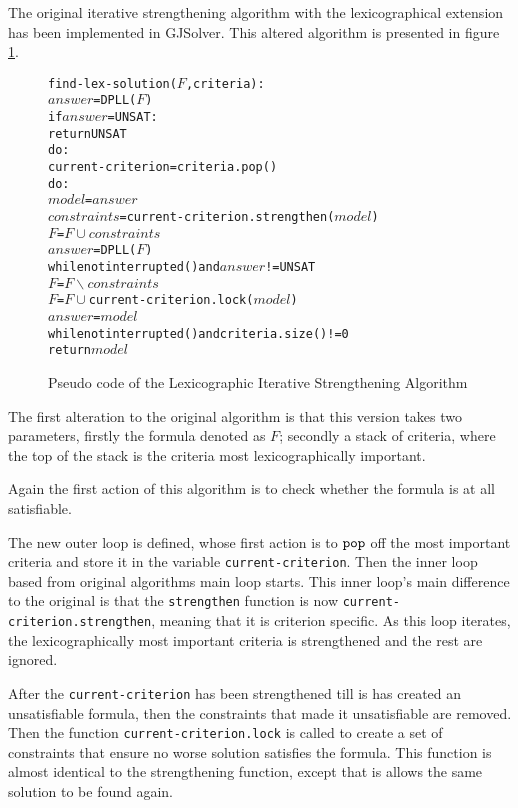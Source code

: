 The original iterative strengthening algorithm with the lexicographical extension has been implemented in GJSolver. 
This altered algorithm is presented in figure \ref{impl.lexstrength}.

\begin{figure}[htp]
\begin{center}
\begin{alltt}
find-lex-solution(\(F\),criteria):
    \(answer\) = DPLL(\(F\))
    if \(answer\) = UNSAT:
        return UNSAT
    do:
        current-criterion = criteria.pop()
        do:
            \(model\) = \(answer\)
            \(constraints\) = current-criterion.strengthen(\(model\))
            \(F\) = \(F \cup constraints\)
            \(answer\) = DPLL(\(F\))
        while not interrupted() and \(answer\) != UNSAT
        \(F\) = \(F \backslash constraints\)
        \(F\) = \(F \cup \) current-criterion.lock(\(model\))
        \(answer\) = \(model\)
    while not interrupted() and criteria.size() != 0
    return \(model\) 
\end{alltt}
  \caption{Pseudo code of the Lexicographic Iterative Strengthening Algorithm}
  \label{impl.lexstrength}
\end{center}
\end{figure}

The first alteration to the original algorithm is that this version takes two parameters, firstly the formula denoted as $F$;
secondly a stack of criteria, where the top of the stack is the criteria most lexicographically important.

Again the first action of this algorithm is to check whether the formula is at all satisfiable.

The new outer loop is defined, whose first action is to $\verb+pop+$ off the most important criteria and store it in the variable \verb+current-criterion+.
Then the inner loop based from original algorithms main loop starts.
This inner loop's main difference to the original is that the \verb+strengthen+ function is now \verb+current-criterion.strengthen+, meaning that it is criterion specific.
As this loop iterates, the lexicographically most important criteria is strengthened and the rest are ignored.

After the \verb+current-criterion+ has been strengthened till is has created an unsatisfiable formula, then the constraints that made it unsatisfiable are removed.
Then the function \verb+current-criterion.lock+ is called to create a set of constraints that ensure no worse solution satisfies the formula.
This function is almost identical to the strengthening function, except that is allows the same solution to be found again.

